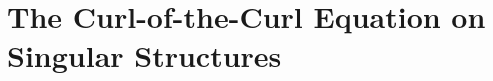 \chapter{The Curl-of-the-Curl Equation on Singular Structures} \label{ch:CurlCurl}











\begin{subappendices}





\end{subappendices}